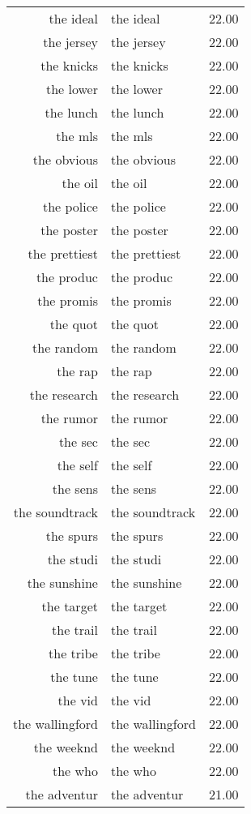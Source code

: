 \begin{table}[ht]
\begin{tabular}{rlr}
  the ideal & the ideal & 22.00 \\ 
  the jersey & the jersey & 22.00 \\ 
  the knicks & the knicks & 22.00 \\ 
  the lower & the lower & 22.00 \\ 
  the lunch & the lunch & 22.00 \\ 
  the mls & the mls & 22.00 \\ 
  the obvious & the obvious & 22.00 \\ 
  the oil & the oil & 22.00 \\ 
  the police & the police & 22.00 \\ 
  the poster & the poster & 22.00 \\ 
  the prettiest & the prettiest & 22.00 \\ 
  the produc & the produc & 22.00 \\ 
  the promis & the promis & 22.00 \\ 
  the quot & the quot & 22.00 \\ 
  the random & the random & 22.00 \\ 
  the rap & the rap & 22.00 \\ 
  the research & the research & 22.00 \\ 
  the rumor & the rumor & 22.00 \\ 
  the sec & the sec & 22.00 \\ 
  the self & the self & 22.00 \\ 
  the sens & the sens & 22.00 \\ 
  the soundtrack & the soundtrack & 22.00 \\ 
  the spurs & the spurs & 22.00 \\ 
  the studi & the studi & 22.00 \\ 
  the sunshine & the sunshine & 22.00 \\ 
  the target & the target & 22.00 \\ 
  the trail & the trail & 22.00 \\ 
  the tribe & the tribe & 22.00 \\ 
  the tune & the tune & 22.00 \\ 
  the vid & the vid & 22.00 \\ 
  the wallingford & the wallingford & 22.00 \\ 
  the weeknd & the weeknd & 22.00 \\ 
  the who & the who & 22.00 \\ 
  the adventur & the adventur & 21.00 \\ 

\end{tabular}
\end{table}
